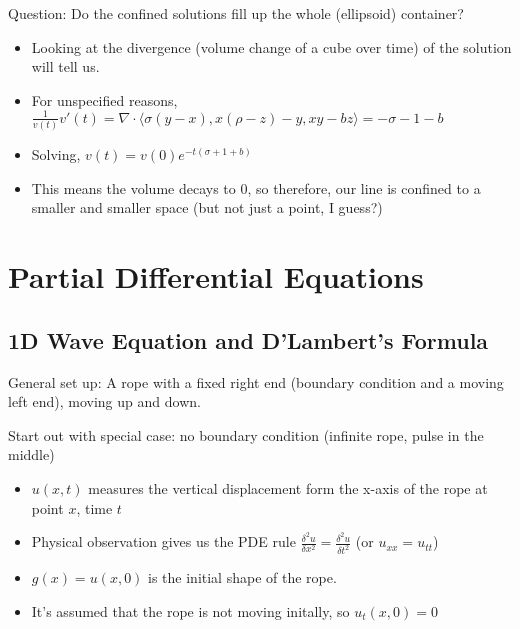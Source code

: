 \documentclass[11pt, oneside]{article}   	%
\begin{document}
Question: Do the confined solutions fill up the whole (ellipsoid) container?  
\begin{itemize}
\item Looking at the divergence (volume change of a cube over time) of the solution will tell us.
\item For unspecified reasons, $\frac{1}{v(t)}v'(t) = \nabla \cdot \langle \sigma(y-x), x(\rho - z) - y, xy-bz \rangle = -\sigma -1 - b$
\item Solving, $v(t) = v(0)e^{-t(\sigma + 1 + b)}$
\item This means the volume decays to 0, so therefore, our line is confined to a smaller and smaller space (but not just a point, I guess?)
\end{itemize}

\section{Partial Differential Equations}
\subsection{1D  Wave Equation and D'Lambert's Formula}

General set up: A rope with a fixed right end  (boundary condition and a moving left end), moving up and down.

Start out with special case: no boundary condition  (infinite rope, pulse in the middle)

\begin{itemize}
\item $u(x,t)$ measures the vertical displacement form the x-axis of the rope at point $x$, time $t$
\item Physical observation gives us the PDE rule $\frac{\delta^2 u}{\delta x^2} = \frac{\delta^2 u}{\delta t^2}$ (or $u_{xx} = u_{tt}$)
\item $g(x) = u(x, 0)$ is the initial shape of the rope.
\item It's assumed that the rope is not moving initally, so $u_t(x,0) = 0$
\end{itemize}
\end{document}
